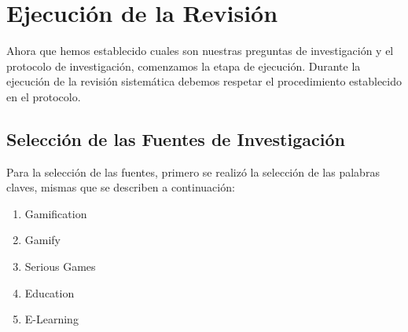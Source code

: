 \documentclass{report}
\begin{document}
        \section{Ejecución de la Revisión}
    
        Ahora que hemos establecido cuales son nuestras preguntas de investigación y el protocolo de investigación, comenzamos la etapa de ejecución. Durante la ejecución de la revisión sistemática debemos respetar el procedimiento establecido en el protocolo.
    
            \subsection{Selección de las Fuentes de  Investigación}
            
            Para la selección de las fuentes, primero se realizó la selección de las palabras claves, mismas que se describen a continuación: 
            \begin{enumerate}
                \item Gamification
                \item Gamify
                \item Serious Games
                \item Education
                \item E-Learning
            \end{enumerate}
    
\end{document}
